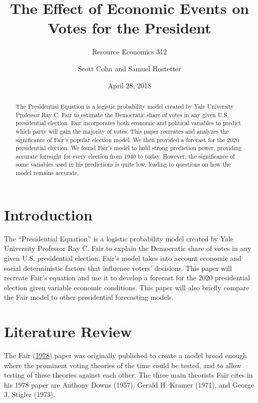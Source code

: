 \documentclass[11,]{article}
\title{The Effect of Economic Events on Votes for the President}
\subtitle{Resource Economics 312}
\author{Scott Cohn and Samuel Hostetter}
\date{April 28, 2018}
\providecommand{\tightlist}{%
  \setlength{\itemsep}{0pt}\setlength{\parskip}{0pt}}
\begin{document}
\maketitle
\begin{abstract}
The Presidential Equation is a logistic probability model created by
Yale University Professor Ray C. Fair to estimate the Democratic share
of votes in any given U.S. presidential election. Fair incorporates both
economic and political variables to predict which party will gain the
majority of votes. This paper recreates and analyzes the significance of
Fair's popular election model. We then provided a forecast for the 2020
presidential election. We found Fair's model to hold strong prediction
power, providing accurate foresight for every election from 1940 to
today. However, the significance of some variables used in his
predictions is quite low, leading to questions on how the model remains
accurate.
\end{abstract}

\providecommand{\tightlist}{%
  \setlength{\itemsep}{0pt}\setlength{\parskip}{0pt}}

\hypertarget{introduction}{%
\section{Introduction}\label{introduction}}

The ``Presidential Equation'' is a logistic probability model created by
Yale University Professor Ray C. Fair to explain the Democratic share of
votes in any given U.S. presidential election. Fair's model takes into
account economic and social deterministic factors that influence voters'
decisions. This paper will recreate Fair's equation and use it to
develop a forecast for the 2020 presidential election given variable
economic conditions. This paper will also briefly compare the Fair model
to other presidential forecasting models.

\hypertarget{literature-review}{%
\section{Literature Review}\label{literature-review}}

The Fair (\protect\hyperlink{ref-fair_effect_1978}{1978}) paper was
originally published to create a model broad enough where the prominent
voting theories of the time could be tested, and to allow testing of
these theories against each other. The three main theorists Fair cites
in his 1978 paper are Anthony Downs (1957), Gerald H. Kramer (1971), and
George J. Stigler (1973).
\end{document}
